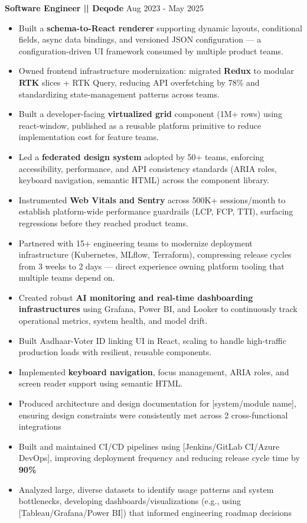 \vspace{5pt}
\textbf{Software Engineer || Deqode}
\hfill Aug 2023 - May 2025
\begin{itemize}
\vspace{2pt}
\item {Built a \textbf{schema-to-React renderer} supporting dynamic layouts, conditional fields, async data bindings, and versioned JSON configuration — a configuration-driven UI framework consumed by multiple product teams.}
\item {Owned frontend infrastructure modernization: migrated \textbf{Redux} to modular \textbf{RTK} slices + RTK Query, reducing API overfetching by 78\% and standardizing state-management patterns across teams.}
\item {Built a developer-facing \textbf{virtualized grid} component (1M+ rows) using react-window, published as a reusable platform primitive to reduce implementation cost for feature teams.}
\item {Led a \textbf{federated design system} adopted by 50+ teams, enforcing accessibility, performance, and API consistency standards (ARIA roles, keyboard navigation, semantic HTML) across the component library.}
\item {Instrumented \textbf{Web Vitals and Sentry} across 500K+ sessions/month to establish platform-wide performance guardrails (LCP, FCP, TTI), surfacing regressions before they reached product teams.}
\item {Partnered with 15+ engineering teams to modernize deployment infrastructure (Kubernetes, MLflow, Terraform), compressing release cycles from 3 weeks to 2 days — direct experience owning platform tooling that multiple teams depend on.}
\item {Created robust \textbf{AI monitoring and real-time dashboarding infrastructures} using Grafana, Power BI, and Looker to continuously track operational metrics, system health, and model drift.}
\item {Built Aadhaar-Voter ID linking UI in React, scaling to handle high-traffic production loads with resilient, reusable components.}
\item {Implemented \textbf{keyboard navigation}, focus management, ARIA roles, and screen reader support using semantic HTML.}
\item Produced architecture and design documentation for [system/module name], ensuring design constraints were consistently met across 2 cross-functional integrations
\item Built and maintained CI/CD pipelines using [Jenkins/GitLab CI/Azure DevOps], improving deployment frequency and reducing release cycle time by \textbf{90\%}
\item Analyzed large, diverse datasets to identify usage patterns and system bottlenecks, developing dashboards/visualizations (e.g., using [Tableau/Grafana/Power BI]) that informed engineering roadmap decisions
\end{itemize}




